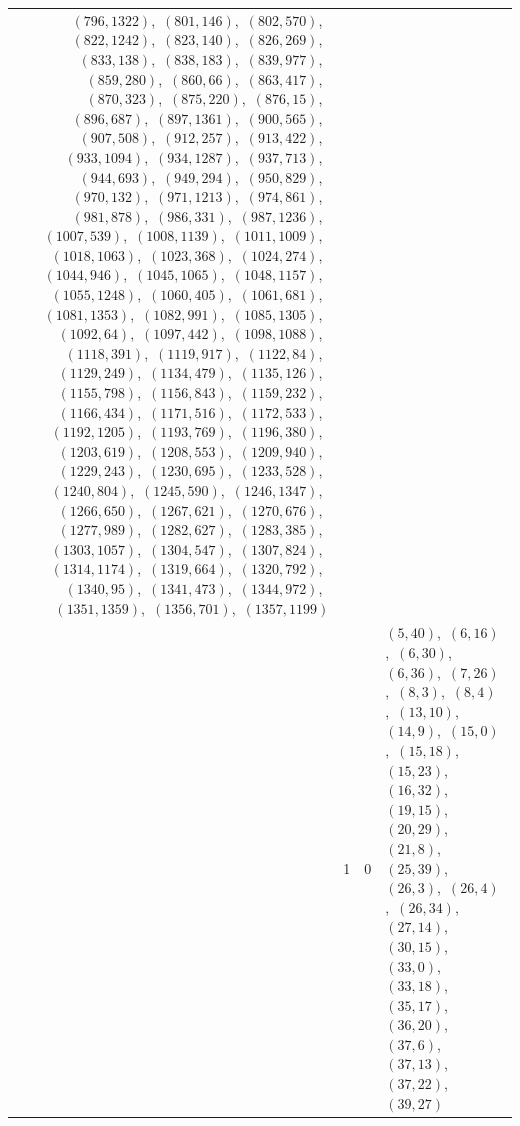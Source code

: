 \documentclass[11pt]{article}
\begin{document}
\begin{longtable}{@{}rrl>{\raggedright\arraybackslash}p{}@{}}
$(796,1322)$,\allowbreak\ $(801,146)$,\allowbreak\ $(802,570)$,\allowbreak\ $(822,1242)$,\allowbreak\ $(823,140)$,\allowbreak\ $(826,269)$,\allowbreak\ $(833,138)$,\allowbreak\ $(838,183)$,\allowbreak\ $(839,977)$,\allowbreak\ $(859,280)$,\allowbreak\ $(860,66)$,\allowbreak\ $(863,417)$,\allowbreak\ $(870,323)$,\allowbreak\ $(875,220)$,\allowbreak\ $(876,15)$,\allowbreak\ $(896,687)$,\allowbreak\ $(897,1361)$,\allowbreak\ $(900,565)$,\allowbreak\ $(907,508)$,\allowbreak\ $(912,257)$,\allowbreak\ $(913,422)$,\allowbreak\ $(933,1094)$,\allowbreak\ $(934,1287)$,\allowbreak\ $(937,713)$,\allowbreak\ $(944,693)$,\allowbreak\ $(949,294)$,\allowbreak\ $(950,829)$,\allowbreak\ $(970,132)$,\allowbreak\ $(971,1213)$,\allowbreak\ $(974,861)$,\allowbreak\ $(981,878)$,\allowbreak\ $(986,331)$,\allowbreak\ $(987,1236)$,\allowbreak\ $(1007,539)$,\allowbreak\ $(1008,1139)$,\allowbreak\ $(1011,1009)$,\allowbreak\ $(1018,1063)$,\allowbreak\ $(1023,368)$,\allowbreak\ $(1024,274)$,\allowbreak\ $(1044,946)$,\allowbreak\ $(1045,1065)$,\allowbreak\ $(1048,1157)$,\allowbreak\ $(1055,1248)$,\allowbreak\ $(1060,405)$,\allowbreak\ $(1061,681)$,\allowbreak\ $(1081,1353)$,\allowbreak\ $(1082,991)$,\allowbreak\ $(1085,1305)$,\allowbreak\ $(1092,64)$,\allowbreak\ $(1097,442)$,\allowbreak\ $(1098,1088)$,\allowbreak\ $(1118,391)$,\allowbreak\ $(1119,917)$,\allowbreak\ $(1122,84)$,\allowbreak\ $(1129,249)$,\allowbreak\ $(1134,479)$,\allowbreak\ $(1135,126)$,\allowbreak\ $(1155,798)$,\allowbreak\ $(1156,843)$,\allowbreak\ $(1159,232)$,\allowbreak\ $(1166,434)$,\allowbreak\ $(1171,516)$,\allowbreak\ $(1172,533)$,\allowbreak\ $(1192,1205)$,\allowbreak\ $(1193,769)$,\allowbreak\ $(1196,380)$,\allowbreak\ $(1203,619)$,\allowbreak\ $(1208,553)$,\allowbreak\ $(1209,940)$,\allowbreak\ $(1229,243)$,\allowbreak\ $(1230,695)$,\allowbreak\ $(1233,528)$,\allowbreak\ $(1240,804)$,\allowbreak\ $(1245,590)$,\allowbreak\ $(1246,1347)$,\allowbreak\ $(1266,650)$,\allowbreak\ $(1267,621)$,\allowbreak\ $(1270,676)$,\allowbreak\ $(1277,989)$,\allowbreak\ $(1282,627)$,\allowbreak\ $(1283,385)$,\allowbreak\ $(1303,1057)$,\allowbreak\ $(1304,547)$,\allowbreak\ $(1307,824)$,\allowbreak\ $(1314,1174)$,\allowbreak\ $(1319,664)$,\allowbreak\ $(1320,792)$,\allowbreak\ $(1340,95)$,\allowbreak\ $(1341,473)$,\allowbreak\ $(1344,972)$,\allowbreak\ $(1351,1359)$,\allowbreak\ $(1356,701)$,\allowbreak\ $(1357,1199)$\\
\addlinespace[3pt]
41 & 1 & $0$ & $(5,40)$,\allowbreak\ $(6,16)$,\allowbreak\ $(6,30)$,\allowbreak\ $(6,36)$,\allowbreak\ $(7,26)$,\allowbreak\ $(8,3)$,\allowbreak\ $(8,4)$,\allowbreak\ $(13,10)$,\allowbreak\ $(14,9)$,\allowbreak\ $(15,0)$,\allowbreak\ $(15,18)$,\allowbreak\ $(15,23)$,\allowbreak\ $(16,32)$,\allowbreak\ $(19,15)$,\allowbreak\ $(20,29)$,\allowbreak\ $(21,8)$,\allowbreak\ $(25,39)$,\allowbreak\ $(26,3)$,\allowbreak\ $(26,4)$,\allowbreak\ $(26,34)$,\allowbreak\ $(27,14)$,\allowbreak\ $(30,15)$,\allowbreak\ $(33,0)$,\allowbreak\ $(33,18)$,\allowbreak\ $(35,17)$,\allowbreak\ $(36,20)$,\allowbreak\ $(37,6)$,\allowbreak\ $(37,13)$,\allowbreak\ $(37,22)$,\allowbreak\ $(39,27)$\\

\end{longtable}
\end{document}
